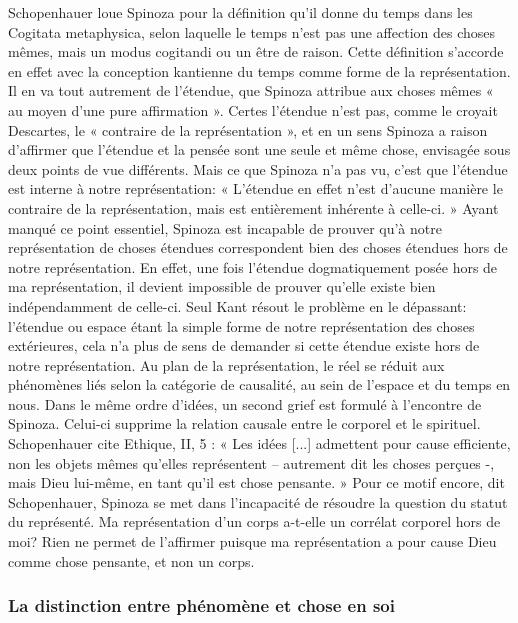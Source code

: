 Schopenhauer loue Spinoza pour la définition qu’il donne du temps dans les Cogitata metaphysica,
selon laquelle le temps n’est pas une affection des choses mêmes, mais un modus cogitandi ou un
être de raison. Cette définition s’accorde en effet avec la conception kantienne du temps comme forme de la
représentation. Il en va tout autrement de l’étendue, que Spinoza attribue aux choses mêmes « au moyen
d’une pure affirmation ». Certes l’étendue n’est pas, comme le croyait Descartes, le
« contraire de la représentation », et en un sens Spinoza a raison d’affirmer que l’étendue et la pensée sont
une seule et même chose, envisagée sous deux points de vue différents. Mais ce que Spinoza n’a pas vu,
c’est que l’étendue est interne à notre représentation: « L’étendue en effet n’est d’aucune manière le contraire
de la représentation, mais est entièrement inhérente à celle-ci. » Ayant manqué ce point essentiel, Spinoza
est incapable de prouver qu’à notre représentation de choses étendues correspondent bien des choses
étendues hors de notre représentation. En effet, une fois l’étendue dogmatiquement posée hors de ma représentation,
il devient impossible de
prouver qu’elle existe bien indépendamment de celle-ci. Seul Kant résout le problème en le dépassant:
l’étendue ou espace étant la simple forme de notre représentation des choses extérieures, cela n’a plus de
sens de demander si cette étendue existe hors de notre représentation. Au plan de la représentation, le réel se
réduit aux phénomènes liés selon la catégorie de causalité, au sein de l’espace et du temps en nous.
Dans le même ordre d’idées, un second grief est formulé à l’encontre de Spinoza. Celui-ci supprime la
relation causale entre le corporel et le spirituel. Schopenhauer cite Ethique, II, 5 : « Les idées [...] admettent
pour cause efficiente, non les objets mêmes qu’elles représentent – autrement dit les choses perçues -, mais
Dieu lui-même, en tant qu’il est chose pensante. » Pour ce motif encore, dit Schopenhauer, Spinoza se met
dans l’incapacité de résoudre la question du statut du représenté. Ma représentation d’un corps a-t-elle un
corrélat corporel hors de moi? Rien ne permet de l’affirmer puisque ma représentation a pour cause Dieu
comme chose pensante, et non un corps.

\subsubsection{La distinction entre phénomène et chose en soi}


